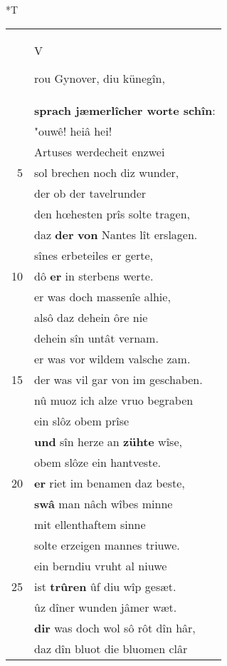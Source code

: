 \documentclass[8pt,a4paper,notitlepage]{article}
\begin{document}
\begin{table}[ht]
\begin{minipage}[t]{0.5\linewidth}
\end{minipage}
\hspace{0.5cm}
\begin{minipage}[t]{0.5\linewidth}
\small
\begin{center}*T
\end{center}
\begin{tabular}{rl}
 & \begin{large}V\end{large}rou Gynover, diu künegîn,\\ 
 & \textbf{sprach jæmerlîcher worte schîn}:\\ 
 & "ouwê! heiâ hei!\\ 
 & Artuses werdecheit enzwei\\ 
5 & sol brechen noch diz wunder,\\ 
 & der ob der tavelrunder\\ 
 & den hœhesten prîs solte tragen,\\ 
 & daz \textbf{der} \textbf{von} Nantes lît erslagen.\\ 
 & sînes erbeteiles er gerte,\\ 
10 & dô \textbf{er} in sterbens werte.\\ 
 & er was doch massenîe alhie,\\ 
 & alsô daz dehein ôre nie\\ 
 & dehein sîn untât vernam.\\ 
 & er was vor wildem valsche zam.\\ 
15 & der was vil gar von im geschaben.\\ 
 & nû muoz ich alze vruo begraben\\ 
 & ein slôz obem prîse\\ 
 & \textbf{und} sîn herze an \textbf{zühte} wîse,\\ 
 & obem slôze ein hantveste.\\ 
20 & \textbf{er} riet im benamen daz beste,\\ 
 & \textbf{swâ} man nâch wîbes minne\\ 
 & mit ellenthaftem sinne\\ 
 & solte erzeigen mannes triuwe.\\ 
 & ein berndiu vruht al niuwe\\ 
25 & ist \textbf{trûren} ûf diu wîp gesæt.\\ 
 & ûz dîner wunden jâmer wæt.\\ 
 & \textbf{dir} was doch wol sô rôt dîn hâr,\\ 
 & daz dîn bluot die bluomen clâr\\ 

\end{tabular}
\end{minipage}
\end{table}
\end{document}
